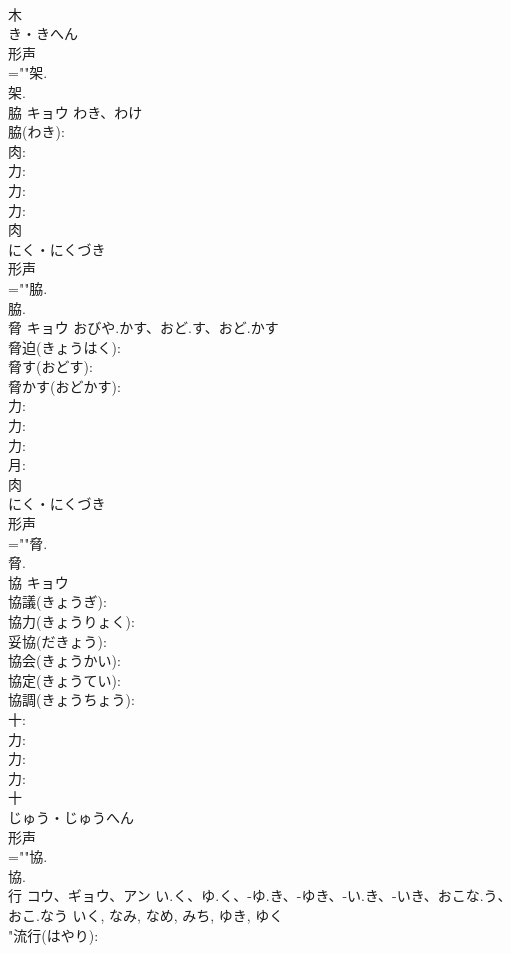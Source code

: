 \documentclass[8pt]{extreport}
\begin{document}
\begin{CJK}{UTF8}{min}
\\	木	
\\	き・きへん	
\\	形声 
\\	=""架.
\\	架.
\\	脇	キョウ	わき、わけ		
\\	脇(わき): 
\\	肉: 
\\	力: 
\\	力: 
\\	力: 
\\	肉	
\\	にく・にくづき	
\\	形声 
\\	=""脇.
\\	脇.
\\	脅	キョウ	おびや.かす、おど.す、おど.かす		
\\	脅迫(きょうはく): 
\\	脅す(おどす): 
\\	脅かす(おどかす): 
\\	力: 
\\	力: 
\\	力: 
\\	月: 
\\	肉	
\\	にく・にくづき	
\\	形声 
\\	=""脅.
\\	脅.
\\	協	キョウ			
\\	協議(きょうぎ): 
\\	協力(きょうりょく): 
\\	妥協(だきょう): 
\\	協会(きょうかい): 
\\	協定(きょうてい): 
\\	協調(きょうちょう): 
\\	十: 
\\	力: 
\\	力: 
\\	力: 
\\	十	
\\	じゅう・じゅうへん	
\\	形声 
\\	=""協.
\\	協.
\\	行	コウ、ギョウ、アン	い.く、ゆ.く、-ゆ.き、-ゆき、-い.き、-いき、おこな.う、おこ.なう	いく, なみ, なめ, みち, ゆき, ゆく	
\\	"流行(はやり): 

\end{CJK}
\end{document}
